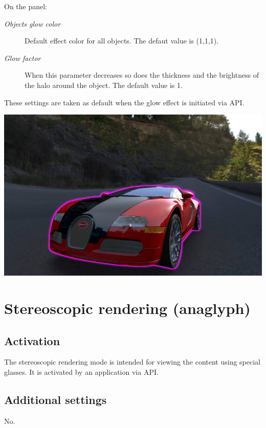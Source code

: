 \documentclass[a4paper,12pt,oneside]{sphinxmanual}
\begin{document}
On the  panel:
\begin{description}
\item[{\emph{Objects glow color}}] \leavevmode
Default effect color for all objects. The defaut value is (1,1,1).

\item[{\emph{Glow factor}}] \leavevmode
When this parameter decreases so does the thickness and the brightness of the halo around the object. The default value is 1.

\end{description}

These settings are taken as default when the glow effect is initiated via API.

{\hfill\includegraphics[width=1.000\linewidth]{glow.jpg}\hfill}


\section{Stereoscopic rendering (anaglyph)}
\label{postprocessing_effects:anaglyph}\label{postprocessing_effects:index-5}\label{postprocessing_effects:id20}

\subsection{Activation}
\label{postprocessing_effects:id21}
The stereoscopic rendering mode is intended for viewing the content using special glasses. It is activated by an application via API.


\subsection{Additional settings}
\label{postprocessing_effects:id22}
No.
\end{document}
